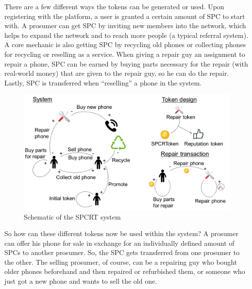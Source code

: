 \documentclass[11pt]{scrartcl}
\begin{document}
There are a few different ways the tokens can be generated or used. Upon registering with the platform, a user is granted a certain amount of SPC to start with. A prosumer can get SPC by inviting new members into the network, which helps to expand the network and to reach more people (a typical referral system). A core mechanic is also getting  SPC by recycling old phones or collecting phones for recycling or reselling  as a service. When giving a repair guy an assignment to repair a phone, SPC can be earned by buying parts necessary for the repair (with real-world money) that are given to the repair guy, so he can do the repair. Lastly, SPC is transferred when ``reselling'' a phone in the system.

\begin{figure}
    \includegraphics[width=\textwidth]{img/cycles.jpeg}
    \caption{Schematic of the SPCRT system}%
    \label{fig:cycles}
\end{figure}

So how can these different tokens now be used within the system? A prosumer can offer his phone for sale in exchange for an individually defined amount of SPCs to another prosumer. So, the SPC gets transferred from one prosumer to the other. The selling prosumer, of course, can be a repairing guy who bought older phones beforehand and then repaired or refurbished them, or someone who just got a new phone and wants to sell the old one.
\end{document}
